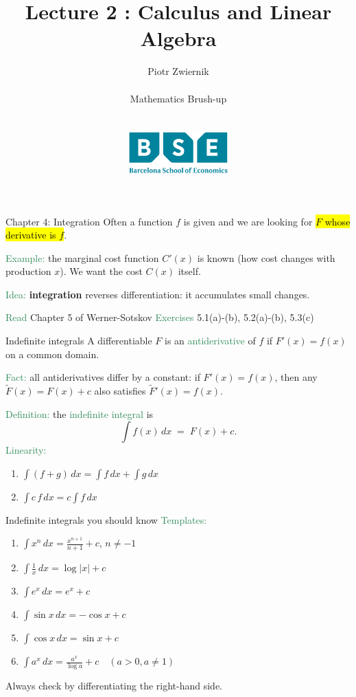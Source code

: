 \documentclass[11pt,aspectratio=169]{beamer}
\title[Calculus and Linear Algebra]{Lecture 2 : Calculus and Linear Algebra}
\author[Piotr Zwiernik, Barcelona School of Economics]{Piotr Zwiernik \\ $\;$\\
Mathematics Brush-up\\ $\;$\\ $\;$\\
\includegraphics[width=1.5in]{img/bse.png}  
}
\date{}
\begin{document}
\begin{frame}
\titlepage
\end{frame}


\begin{frame}{Chapter 4: Integration}
Often a function $f$ is given and we are looking for \hl{$F$ whose derivative is $f$}.
\bigskip

\textcolor{SeaGreen}{Example:} the marginal cost function $C'(x)$ is known (how cost changes with production $x$). We want the cost $C(x)$ itself.
\bigskip

\textcolor{SeaGreen}{Idea:} \textbf{integration} reverses differentiation: it accumulates small changes.
\bigskip

\textcolor{SeaGreen}{Read} Chapter 5 of Werner-Sotskov \quad
\textcolor{SeaGreen}{Exercises} 5.1(a)-(b), 5.2(a)-(b), 5.3(c)
\end{frame}

\begin{frame}{Indefinite integrals}
A differentiable $F$ is an \textcolor{SeaGreen}{antiderivative} of $f$ if $F'(x)=f(x)$ on a common domain.
\bigskip

\textcolor{SeaGreen}{Fact:} all antiderivatives differ by a constant: if $F'(x)=f(x)$, then any $\tilde F(x)=F(x)+c$ also satisfies $\tilde F'(x)=f(x)$.
\bigskip

\textcolor{SeaGreen}{Definition:} the \textcolor{SeaGreen}{indefinite integral} is
\[
\int f(x)\,dx \;=\; F(x)+c.
\]
\textcolor{SeaGreen}{Linearity:}
\begin{enumerate}
\item $\int (f+g)\,dx=\int f\,dx+\int g\,dx$
\item $\int c\,f\,dx=c\int f\,dx$
\end{enumerate}
\end{frame}

\begin{frame}{Indefinite integrals you should know}
\textcolor{SeaGreen}{Templates:}
\begin{enumerate}
\item $\displaystyle \int x^n\,dx=\frac{x^{n+1}}{n+1}+c$, $n\neq -1$ \quad 
\item $\displaystyle \int \frac{1}{x}\,dx=\log|x|+c$
\item $\displaystyle \int e^x\,dx=e^x+c$
\item $\displaystyle \int \sin x\,dx=-\cos x+c$
\item $\displaystyle \int \cos x\,dx=\sin x+c$
\item $\displaystyle \int a^x\,dx=\frac{a^x}{\log a}+c \quad (a>0,a\neq 1)$
\end{enumerate}
{\small Always check by differentiating the right-hand side.}
\end{frame}
\end{document}
